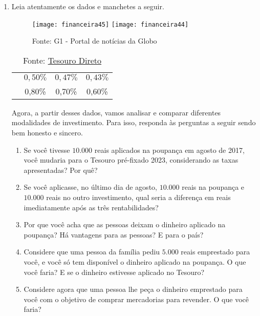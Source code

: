 \begin{enumerate}
\item Leia atentamente os dados e manchetes a seguir.

\begin{figure}[H]
\centering

\texttt{[image: financeira45]}
\texttt{[image: financeira44]}

\caption{Fonte: G1 - Portal de notícias da Globo}
\end{figure}

\begin{table}[H]
\centering
\begin{tabu} to \textwidth{|c|c|c|c|}
\hhline{~|---|}
&  &  &  \\
\hline
{} & $0,50\%$ & $0,47\% $& $0,43\% $\\
\hline
{} & 0,80\% & 0,70\% & 0,60\% \\
\hline
\end{tabu}
\caption{Fonte: \href{http://www.tesouro.fazenda.gov.br/tesouro-direto-precos-e-taxas-dos-titulos;  http://www4.bcb.gov.br/pec/poupanca/poupanca.asp}{Tesouro Direto}}
\end{table}

Agora, a partir desses dados, vamos analisar e comparar diferentes modalidades de investimento. Para isso, responda às perguntas a seguir sendo bem honesto e sincero.
  \begin{enumerate}
  \item Se você tivesse $10.000$ reais aplicados na poupança em agosto de 2017, você mudaria para o Tesouro pré-fixado 2023, considerando as taxas apresentadas? Por quê?
  \item Se você aplicasse, no último dia de agosto, $10.000$ reais na poupança e $10.000$ reais no outro investimento, qual seria a diferença em reais imediatamente após as três rentabilidades? 
  \item Por que você acha que as pessoas deixam o dinheiro aplicado na poupança? Há vantagens para as pessoas? E para o país?
  \item Considere que uma pessoa da família pediu $5.000$ reais emprestado para você, e você só tem disponível o dinheiro aplicado na poupança. O que você faria? E se o dinheiro estivesse aplicado no Tesouro? 
  \item Considere agora que uma pessoa lhe peça o dinheiro emprestado para você com o objetivo de comprar mercadorias para revender. O que você faria?
  \end{enumerate}


\end{enumerate}
